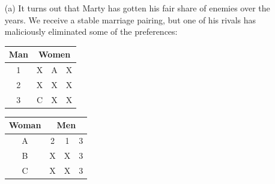 \documentclass[11pt]{article}
\newif\ifsolutions
\begin{document}
\begin{qunlist}
\begin{itemize}
 

\ifsolutions
\fi


\end{itemize} 
    



        

\begin{itemize}
\item[(a)] It turns out that Marty has gotten his fair share of enemies over the years. 
We receive a stable marriage pairing, but one of his rivals has maliciously eliminated some of the preferences:

\begin{center}
\begin{tabular}{|c|ccc|}\hline 
Man&\multicolumn{3}{|c|}{Women}\\\hline 
1&X&A&X\\\hline 
2&X&X&X\\\hline 
3&C&X&X\\\hline
\end{tabular} 
\hspace{2cm}
\begin{tabular}{|c|ccc|}\hline 
Woman&\multicolumn{3}{|c|}{Men}\\\hline 
A&2&1&3\\\hline 
B&X&X&3\\\hline 
C&X&X&3\\\hline
\end{tabular}
\end{center}
        

\end{itemize}
\end{qunlist}
\end{document}
